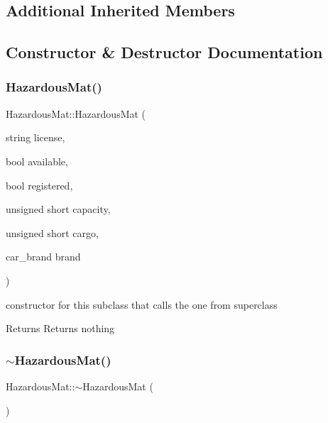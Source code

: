 \subsection*{Additional Inherited Members}


\subsection{Constructor \& Destructor Documentation}
\mbox{\label{class_hazardous_mat_a59551c520358aaae7ed899c2344af6a9}} 
\subsubsection{\texorpdfstring{Hazardous\+Mat()}{HazardousMat()}}
{\footnotesize\ttfamily Hazardous\+Mat\+::\+Hazardous\+Mat (\begin{DoxyParamCaption}\item[{string}]{license,  }\item[{bool}]{available,  }\item[{bool}]{registered,  }\item[{unsigned short}]{capacity,  }\item[{unsigned short}]{cargo,  }\item[{car\+\_\+brand}]{brand }\end{DoxyParamCaption})}



constructor for this subclass that calls the one from superclass 

\begin{DoxyReturn}{Returns}
Returns nothing 
\end{DoxyReturn}
\mbox{\label{class_hazardous_mat_aa4304419b08381d4aa46d240ca44738a}} 
\subsubsection{\texorpdfstring{$\sim$\+Hazardous\+Mat()}{~HazardousMat()}}
{\footnotesize\ttfamily Hazardous\+Mat\+::$\sim$\+Hazardous\+Mat (\begin{DoxyParamCaption}{ }\end{DoxyParamCaption})\hspace{0.3cm}{\ttfamily [inline]}}



